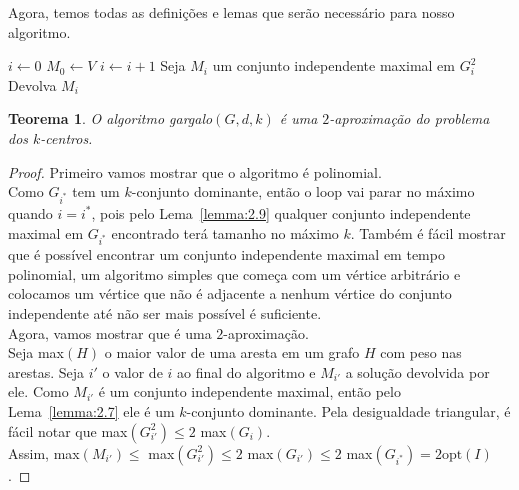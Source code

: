 \documentclass[12pt]{article}
\newcommand{\opt}{\ensuremath{\mathrm{opt}}}
\newtheorem{theorem}{Teorema}[section]
\newcommand{\red}[1]{{\color{red}{#1}}}
\begin{document}
Agora, temos todas as definições e lemas que serão necessário para nosso algoritmo.
\begin{algorithm}
    \begin{algorithmic}[1]
        \State $i \leftarrow 0$
        \State $M_0 \leftarrow V$
            \State $i\leftarrow i + 1$
            \State Seja $M_i$ um conjunto independente maximal em $G_i^2$
        \EndWhile
        \State Devolva $M_i$
        \EndFunction
    \end{algorithmic}
\end{algorithm}

\begin{theorem}
    O algoritmo {\sc gargalo}$(G,d,k)$ é uma $2$-aproximação do problema dos $k$-centros.
\end{theorem}
\begin{proof}
    Primeiro vamos mostrar que o algoritmo é polinomial. \\
    Como $G_{i^*}$ tem um $k$-conjunto dominante, então o loop vai parar no máximo quando $i=i^*$, pois pelo Lema~\ref{lemma:2.9} qualquer conjunto independente maximal em $G_{i^*}$ encontrado terá tamanho no máximo $k$.
    Também é fácil mostrar que é possível encontrar um conjunto independente maximal em tempo polinomial, um algoritmo simples que começa com um vértice arbitrário e colocamos um vértice que não é adjacente a nenhum vértice do conjunto independente até não ser mais possível é suficiente. \red{Faço um lema para abordar melhor?}\\
    Agora, vamos mostrar que é uma $2$-aproximação. \\
    Seja max$(H)$ o maior valor de uma aresta em um grafo $H$ com peso nas arestas. Seja $i'$ o valor de $i$ ao final do algoritmo e $M_{i'}$ a solução devolvida por ele. Como $M_{i'}$ é um conjunto independente maximal, então pelo Lema~\ref{lemma:2.7} ele é um $k$-conjunto dominante. Pela desigualdade triangular, é fácil notar que max$(G_{i'}^2) \leq 2$  max$(G_{i})$. \\Assim, max$(M_{i'}) \leq $ max$(G_{i'}^2) \leq 2$ max$(G_{i'}) \leq 2$ max$(G_{i^*})= 2 \opt(I)$. 
\end{proof}
\end{document}
